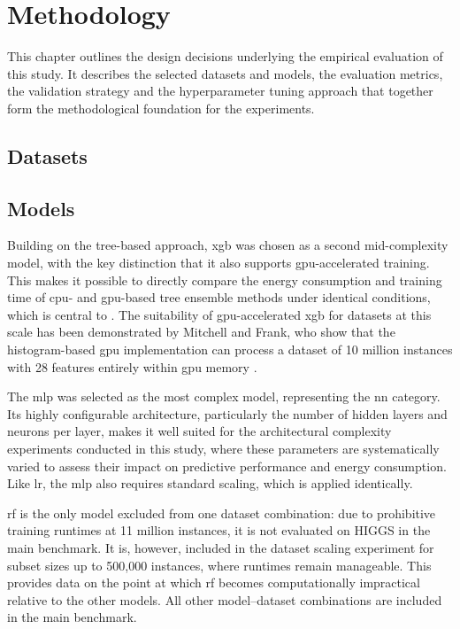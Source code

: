 \chapter{Methodology}
\label{experimental_design}
This chapter outlines the design decisions underlying the empirical evaluation of this study. It describes the selected datasets and models, the evaluation metrics, the validation strategy and the hyperparameter tuning approach that together form the methodological foundation for the experiments.

\section{Datasets}

\section{Models}
\label{design_models}


Building on the tree-based approach, \gls{xgb} was chosen as a second mid-complexity model, with the key distinction that it also supports \gls{gpu}-accelerated training. This makes it possible to directly compare the energy consumption and training time of \gls{cpu}- and \gls{gpu}-based tree ensemble methods under identical conditions, which is central to . The suitability of \gls{gpu}-accelerated \gls{xgb} for datasets at this scale has been demonstrated by Mitchell and Frank, who show that the histogram-based \gls{gpu} implementation can process a dataset of 10 million instances with 28 features entirely within \gls{gpu} memory \cite{mitchellAcceleratingXGBoostAlgorithm2017}.

The \gls{mlp} was selected as the most complex model, representing the \gls{nn} category. Its highly configurable architecture, particularly the number of hidden layers and neurons per layer, makes it well suited for the architectural complexity experiments conducted in this study, where these parameters are systematically varied to assess their impact on predictive performance and energy consumption. Like \gls{lr}, the \gls{mlp} also requires standard scaling, which is applied identically.




\gls{rf} is the only model excluded from one dataset combination: due to prohibitive training runtimes at 11 million instances, it is not evaluated on HIGGS in the main benchmark. It is, however, included in the dataset scaling experiment for subset sizes up to 500{,}000 instances, where runtimes remain manageable. This provides data on the point at which \gls{rf} becomes computationally impractical relative to the other models. All other model--dataset combinations are included in the main benchmark.


